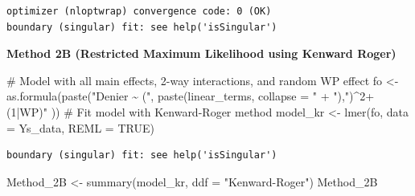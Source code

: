 \documentclass[
  letterpaper,
  DIV=11,
  numbers=noendperiod]{scrartcl}
\newenvironment{Shaded}{\begin{snugshade}}{\end{snugshade}}
\newcommand{\AttributeTok}[1]{\textcolor[rgb]{0.40,0.45,0.13}{#1}}
\newcommand{\CommentTok}[1]{\textcolor[rgb]{0.37,0.37,0.37}{#1}}
\newcommand{\ConstantTok}[1]{\textcolor[rgb]{0.56,0.35,0.01}{#1}}
\newcommand{\FunctionTok}[1]{\textcolor[rgb]{0.28,0.35,0.67}{#1}}
\newcommand{\NormalTok}[1]{\textcolor[rgb]{0.00,0.23,0.31}{#1}}
\newcommand{\OtherTok}[1]{\textcolor[rgb]{0.00,0.23,0.31}{#1}}
\newcommand{\StringTok}[1]{\textcolor[rgb]{0.13,0.47,0.30}{#1}}
\begin{document}
\begin{verbatim}
optimizer (nloptwrap) convergence code: 0 (OK)
boundary (singular) fit: see help('isSingular')
\end{verbatim}

\textbf{Method 2B (Restricted Maximum Likelihood using Kenward Roger)}

\begin{Shaded}
\begin{Highlighting}[]
\CommentTok{\# Model with all main effects, 2{-}way interactions, and random WP effect}
\NormalTok{fo }\OtherTok{\textless{}{-}} \FunctionTok{as.formula}\NormalTok{(}\FunctionTok{paste}\NormalTok{(}\StringTok{"Denier \textasciitilde{} ("}\NormalTok{, }
    \FunctionTok{paste}\NormalTok{(linear\_terms, }\AttributeTok{collapse =} \StringTok{" + "}\NormalTok{),}\StringTok{")\^{}2+ (1|WP)"}
\NormalTok{  ))}
\CommentTok{\# Fit model with Kenward{-}Roger method}
\NormalTok{model\_kr }\OtherTok{\textless{}{-}} \FunctionTok{lmer}\NormalTok{(fo, }\AttributeTok{data =}\NormalTok{ Ys\_data, }\AttributeTok{REML =} \ConstantTok{TRUE}\NormalTok{)}
\end{Highlighting}
\end{Shaded}

\begin{verbatim}
boundary (singular) fit: see help('isSingular')
\end{verbatim}

\begin{Shaded}
\begin{Highlighting}[]
\NormalTok{Method\_2B }\OtherTok{\textless{}{-}} \FunctionTok{summary}\NormalTok{(model\_kr, }\AttributeTok{ddf =} \StringTok{"Kenward{-}Roger"}\NormalTok{)}
\NormalTok{Method\_2B}
\end{Highlighting}
\end{Shaded}
\end{document}
